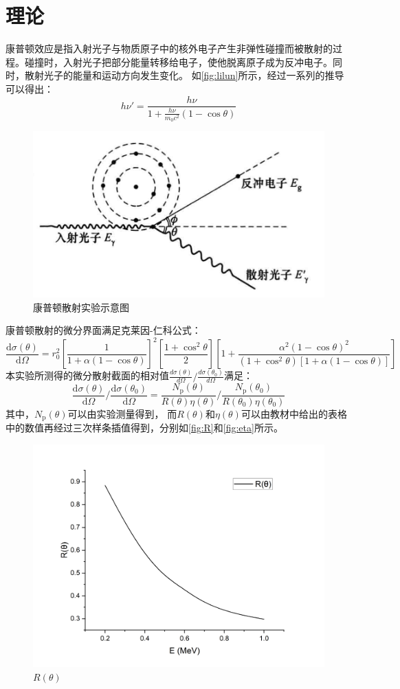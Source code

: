 \documentclass[font=default]{mpltx}
\begin{document}
\section{理论}
康普顿效应是指入射光子与物质原子中的核外电子产生非弹性碰撞而被散射的过程。碰撞时，入射光子把部分能量转移给电子，使他脱离原子成为反冲电子。同时，散射光子的能量和运动方向发生变化。
如\autoref{fig:lilun}所示，经过一系列的推导可以得出：
$$ 
h\nu' = \frac{h\nu}{1 + \frac{h\nu}{m_0 c^2}(1 - \cos\theta)}
$$
\begin{figure}
  \centering
  \includegraphics[width=0.85\linewidth]{fig/lilun.png}
  \caption{康普顿散射实验示意图}
  \label{fig:lilun}
\end{figure}
  
康普顿散射的微分界面满足克莱因-仁科公式：
$$ 
\frac{\mathrm{d}\sigma(\theta)}{\mathrm{d}\Omega} = r_0^2 \left[ \frac{1}{1 + \alpha(1 - \cos\theta)} \right]^2 \left[ \frac{1 + \cos^2\theta}{2} \right] \left[ 1 + \frac{\alpha^2(1 - \cos\theta)^2}{(1 + \cos^2\theta)\left[ 1 + \alpha(1 - \cos\theta) \right]} \right]
$$
本实验所测得的微分散射截面的相对值$\frac{d\sigma(\theta)}{d\Omega}/\frac{d\sigma(\theta_0)}{d\Omega}$满足：
$$
\frac{\mathrm{d}\sigma(\theta)}{\mathrm{d}\Omega} \bigg/ \frac{\mathrm{d}\sigma(\theta_0)}{\mathrm{d}\Omega} = \frac{N_{\mathrm{p}}(\theta)}{R(\theta)\eta(\theta)} \bigg/ \frac{N_{\mathrm{p}}(\theta_0)}{R(\theta_0)\eta(\theta_0)}
$$
其中，$N_{\mathrm{p}}(\theta)$可以由实验测量得到，
而$R(\theta)$和$\eta(\theta)$可以由教材\cite{jindaiwulishiyan}中给出的表格中的数值再经过三次样条插值得到，分别如\autoref{fig:R}和\autoref{fig:eta}所示。

\begin{figure}[htbp]
  \centering
  \includegraphics[width=0.85\linewidth]{fig/R.png}
  \caption{$R(\theta)$}
  \label{fig:R}
\end{figure}
\end{document}
